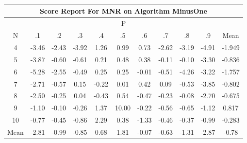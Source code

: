 \documentclass[11pt,a4paper]{report}
\begin{document}
\begin{longtable}{ | c || c | c | c | c | c | c | c | c | c || c |}
\hline
\multicolumn{11}{|c|}{ Score Report For MNR on Algorithm MinusOne} \\
\hline
\multicolumn{11}{|c|}{ P } \\
\hline
N & .1 & .2 & .3 & .4 & .5 & .6 & .7 & .8 & .9 & Mean\\
 \hline
 \hline
 \endhead
  4 &  \cellcolor[HTML]{FFA7A7} -3.46 &  \cellcolor[HTML]{FFBFBF} -2.43 &  \cellcolor[HTML]{FF9F9F} -3.92 &  \cellcolor[HTML]{DFDFFF} 1.26 &  \cellcolor[HTML]{E7E7FF} 0.99 &  \cellcolor[HTML]{EFEFFF} 0.73 &  \cellcolor[HTML]{FFBFBF} -2.62 &  \cellcolor[HTML]{FFAFAF} -3.19 &  \cellcolor[HTML]{FF8787} -4.91 & -1.949 \\
  5 &  \cellcolor[HTML]{FF9F9F} -3.87 &  \cellcolor[HTML]{FFEFEF} -0.60 &  \cellcolor[HTML]{FFEFEF} -0.61 &  \cellcolor[HTML]{F7F7FF} 0.21 &  \cellcolor[HTML]{EFEFFF} 0.48 &  \cellcolor[HTML]{F7F7FF} 0.38 &  \cellcolor[HTML]{FFFFFF} -0.11 &  \cellcolor[HTML]{FFFFFF} -0.10 &  \cellcolor[HTML]{FFAFAF} -3.30 & -0.836 \\
  6 &  \cellcolor[HTML]{FF7878} -5.28 &  \cellcolor[HTML]{FFBFBF} -2.55 &  \cellcolor[HTML]{FFEFEF} -0.49 &  \cellcolor[HTML]{F7F7FF} 0.25 &  \cellcolor[HTML]{F7F7FF} 0.25 &  \cellcolor[HTML]{FFFFFF} -0.01 &  \cellcolor[HTML]{FFEFEF} -0.51 &  \cellcolor[HTML]{FF9797} -4.26 &  \cellcolor[HTML]{FFAFAF} -3.22 & -1.757 \\
  7 &  \cellcolor[HTML]{FFB7B7} -2.71 &  \cellcolor[HTML]{FFEFEF} -0.57 &  \cellcolor[HTML]{FFFFFF} 0.15 &  \cellcolor[HTML]{FFF7F7} -0.22 &  \cellcolor[HTML]{FFFFFF} 0.01 &  \cellcolor[HTML]{F7F7FF} 0.42 &  \cellcolor[HTML]{FFFFFF} 0.09 &  \cellcolor[HTML]{FFEFEF} -0.53 &  \cellcolor[HTML]{FF9F9F} -3.85 & -0.802 \\
  8 &  \cellcolor[HTML]{FFBFBF} -2.50 &  \cellcolor[HTML]{FFF7F7} -0.25 &  \cellcolor[HTML]{FFFFFF} 0.04 &  \cellcolor[HTML]{FFF7F7} -0.43 &  \cellcolor[HTML]{EFEFFF} 0.54 &  \cellcolor[HTML]{FFF7F7} -0.47 &  \cellcolor[HTML]{FFF7F7} -0.23 &  \cellcolor[HTML]{FFFFFF} -0.08 &  \cellcolor[HTML]{FFB7B7} -2.70 & -0.675 \\
  9 &  \cellcolor[HTML]{FFE7E7} -1.10 &  \cellcolor[HTML]{FFFFFF} -0.10 &  \cellcolor[HTML]{FFF7F7} -0.26 &  \cellcolor[HTML]{DFDFFF} 1.37 &  \cellcolor[HTML]{0808FF} 10.00 &  \cellcolor[HTML]{FFF7F7} -0.22 &  \cellcolor[HTML]{FFEFEF} -0.56 &  \cellcolor[HTML]{FFEFEF} -0.65 &  \cellcolor[HTML]{FFDFDF} -1.12 & 0.817 \\
  10 &  \cellcolor[HTML]{FFEFEF} -0.77 &  \cellcolor[HTML]{FFF7F7} -0.45 &  \cellcolor[HTML]{FFE7E7} -0.86 &  \cellcolor[HTML]{C7C7FF} 2.29 &  \cellcolor[HTML]{F7F7FF} 0.38 &  \cellcolor[HTML]{FFDFDF} -1.33 &  \cellcolor[HTML]{FFF7F7} -0.46 &  \cellcolor[HTML]{FFF7F7} -0.37 &  \cellcolor[HTML]{FFE7E7} -0.99 & -0.283 \\
 \hline
 \hline
Mean &  \cellcolor[HTML]{FFB7B7} -2.81 &  \cellcolor[HTML]{FFE7E7} -0.99 &  \cellcolor[HTML]{FFE7E7} -0.85 &  \cellcolor[HTML]{EFEFFF} 0.68 &  \cellcolor[HTML]{CFCFFF} 1.81 &  \cellcolor[HTML]{FFFFFF} -0.07 &  \cellcolor[HTML]{FFEFEF} -0.63 &  \cellcolor[HTML]{FFDFDF} -1.31 &  \cellcolor[HTML]{FFB7B7} -2.87 &  \cellcolor[HTML]{FFEFEF} -0.78
\end{longtable}
\end{document}
